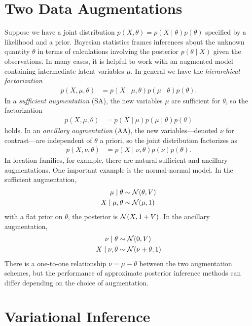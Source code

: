 \documentclass{article}
\begin{document}
\section{Two Data Augmentations}

Suppose we have a joint distribution $p(X,\theta) = p(X\mid\theta)p(\theta)$ specified by a likelihood and a prior. Bayesian statistics frames inferences about the unknown quantity $\theta$ in terms of calculations involving the posterior $p(\theta\mid X)$ given the observations. In many cases, it is helpful to work with an augmented model containing intermediate latent variables $\mu$. In general we have the {\sl hierarchical factorization}
\begin{align}
p(X,\mu,\theta) 
&= p(X\mid \mu,\theta)p(\mu\mid\theta)p(\theta).
\end{align}
In a {\sl sufficient augmentation} (SA), the new variables $\mu$ are sufficient for $\theta$, so the factorization
\begin{align}
p(X,\mu,\theta) 
&= p(X\mid \mu)p(\mu\mid\theta)p(\theta)
\end{align}
holds. In an {\sl ancillary augmentation} (AA), the new variables---denoted $\nu$ for contrast---are independent of $\theta$ a priori, so the joint distribution factorizes as 
\begin{align}
p(X,\nu,\theta) 
&= p(X\mid \nu,\theta)p(\nu)p(\theta).
\end{align}
 In location families, for example, there are natural sufficient and ancillary augmentations. One important example is the normal-normal model. In the sufficient augmentation,
\begin{align}
\mu \mid \theta
&\sim \mathcal{N}(\theta,V) \\
X\mid \mu,\theta
&\sim \mathcal{N}(\mu,1)
\end{align}
with a flat prior on $\theta$, the posterior is $\mathcal{N}(X,1+V)$. In the ancillary augmentation,
\begin{align}
\nu \mid \theta
&\sim \mathcal{N}(0,V) \\
X\mid \nu,\theta
&\sim \mathcal{N}(\nu +\theta,1)
\end{align}
There is a one-to-one relationship $\nu=\mu-\theta$ between the two augmentation schemes, but the performance of approximate posterior inference methods can differ depending on the choice of augmentation.

\section{Variational Inference}
\end{document}
